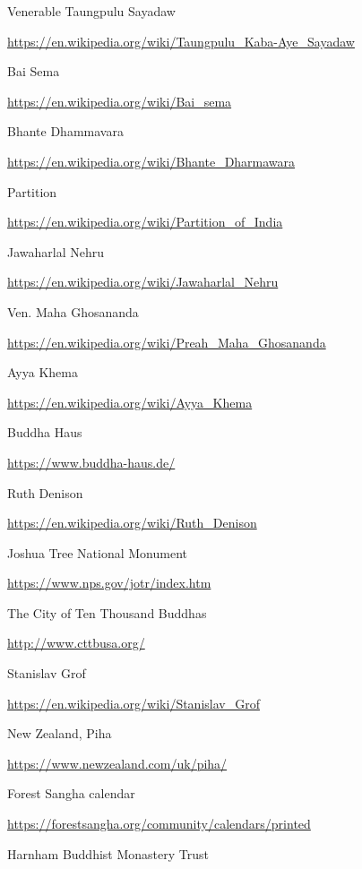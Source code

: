 \begin{thebibliography}{9}
 Venerable Taungpulu Sayadaw

  {\urlsize \url{https://en.wikipedia.org/wiki/Taungpulu_Kaba-Aye_Sayadaw}}

 Bai Sema

  {\urlsize \url{https://en.wikipedia.org/wiki/Bai_sema}}

 Bhante Dhammavara

  {\urlsize \url{https://en.wikipedia.org/wiki/Bhante_Dharmawara}}

 Partition

  {\urlsize \url{https://en.wikipedia.org/wiki/Partition_of_India}}

 Jawaharlal Nehru

  {\urlsize \url{https://en.wikipedia.org/wiki/Jawaharlal_Nehru}}

 Ven. Maha Ghosananda

  {\urlsize \url{https://en.wikipedia.org/wiki/Preah_Maha_Ghosananda}}

 Ayya Khema

  {\urlsize \url{https://en.wikipedia.org/wiki/Ayya_Khema}}

 Buddha Haus

  {\urlsize \url{https://www.buddha-haus.de/}}

 Ruth Denison

  {\urlsize \url{https://en.wikipedia.org/wiki/Ruth_Denison}}

 Joshua Tree National Monument

  {\urlsize \url{https://www.nps.gov/jotr/index.htm}}

 The City of Ten Thousand Buddhas

  {\urlsize \url{http://www.cttbusa.org/}}

 Stanislav Grof

  {\urlsize \url{https://en.wikipedia.org/wiki/Stanislav_Grof}}

 New Zealand, Piha

  {\urlsize \url{https://www.newzealand.com/uk/piha/}}

 Forest Sangha calendar

  {\urlsize \url{https://forestsangha.org/community/calendars/printed}}

 Harnham Buddhist Monastery Trust


\end{thebibliography}
